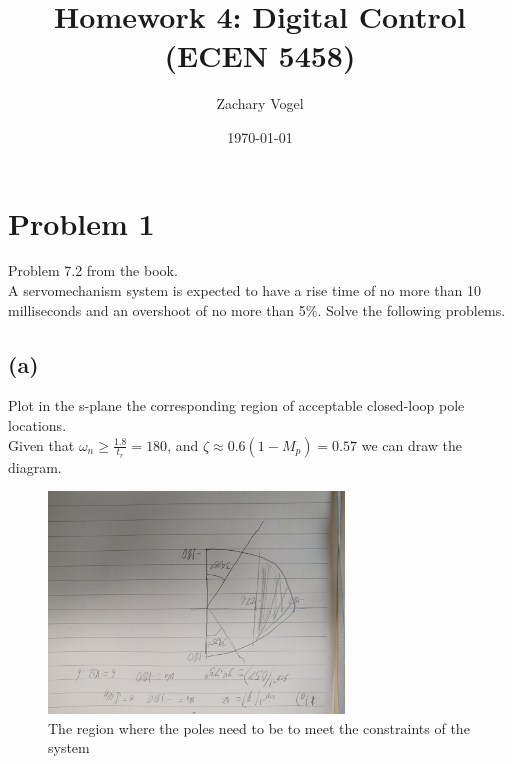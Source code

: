 \documentclass{article}
\title{Homework 4: Digital Control (ECEN 5458)}
\author{Zachary Vogel}
\date{\today}
\begin{document}
\maketitle

\section*{Problem 1}
Problem 7.2 from the book.\\
A servomechanism system is expected to have a rise time of no more than 10 milliseconds and an overshoot of no more than 5\%. Solve the following problems.
\subsection*{(a)}
Plot in the s-plane the corresponding region of acceptable closed-loop pole locations.\\

Given that $\omega_n\geq \frac{1.8}{t_r}=180$, and $\zeta\approx 0.6(1-M_p)=0.57$ we can draw the diagram.
\begin{figure}[H]
    \centering
    \includegraphics[width=0.7\textwidth,angle=180]{PR1_region.jpg}
    \caption{The region where the poles need to be to meet the constraints of the system}
\end{figure}
\end{document}
